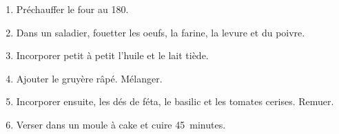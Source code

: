 \serves{}
\makes{}

\begin{ingredients}
\end{ingredients}

\begin{recipe}
  \begin{enumerate}

  \item Pr\'echauffer le four au 180\C.

  \item Dans un saladier, fouetter les oeufs, la farine, la levure et
    du poivre.

  \item Incorporer petit \`a petit l'huile et le lait ti\`ede.

  \item Ajouter le gruy\`ere r\^ap\'e. M\'elanger.

  \item Incorporer ensuite, les d\'es de f\'eta, le basilic et les tomates
    cerises.  Remuer.

  \item Verser dans un moule \`a cake et cuire 45~minutes.


  \end{enumerate}
\end{recipe}
